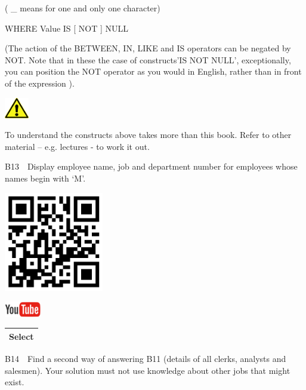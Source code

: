 ( \_ means for one and only one character)

WHERE Value IS [ NOT ] NULL

(The action of the BETWEEN, IN, LIKE and IS operators can be negated by NOT. Note that in these the case of constructs{}'IS NOT NULL', exceptionally, you can position the NOT operator as you would in English, rather than in front of the expression ).



\begin{center}
  
\includegraphics[width=1.06cm,height=0.903cm]{images/img (2).png}

\end{center}
To understand the constructs above takes more than this book. Refer to other material -- e.g. lectures - to work it out.

B13\ \ Display employee name, job and department number for employees whose names begin with `M'.

\begin{center}
\begin{minipage}{4.849cm}
   
\includegraphics[width=4.341cm,height=4.341cm]{images/img (28).png}
 

   
\includegraphics[width=1.582cm,height=0.674cm]{images/img (15).png}
 
\end{minipage}
\end{center}
\begin{flushleft}
\tablefirsthead{}
\tablehead{}
\tabletail{}
\tablelasttail{}
\begin{supertabular}{|m{11.493cm}|}
\hline
 Select 

\\\hline
\end{supertabular}
\end{flushleft}
B14\ \ Find a second way of answering B11 (details of all clerks, analysts and salesmen). Your solution must not use knowledge about other jobs that might exist.

